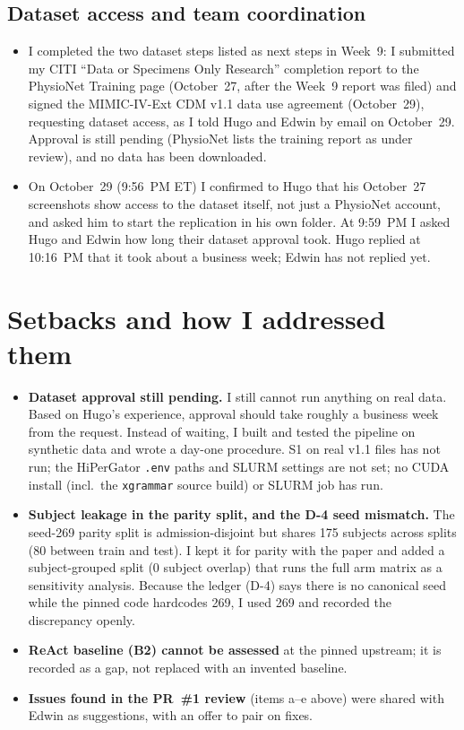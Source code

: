 \documentclass[11pt,letterpaper]{article}
\begin{document}
\subsection{Dataset access and team coordination}
\begin{itemize}
  \item I completed the two dataset steps listed as next steps in Week~9: I submitted my CITI ``Data or Specimens Only Research'' completion report to the PhysioNet Training page (October~27, after the Week~9 report was filed) and signed the MIMIC-IV-Ext CDM v1.1 data use agreement (October~29), requesting dataset access, as I told Hugo and Edwin by email on October~29. Approval is still pending (PhysioNet lists the training report as under review), and no data has been downloaded.
  \item On October~29 (9:56~PM ET) I confirmed to Hugo that his October~27 screenshots show access to the dataset itself, not just a PhysioNet account, and asked him to start the replication in his own folder. At 9:59~PM I asked Hugo and Edwin how long their dataset approval took. Hugo replied at 10:16~PM that it took about a business week; Edwin has not replied yet.
\end{itemize}

\section{Setbacks and how I addressed them}
\begin{itemize}
  \item \textbf{Dataset approval still pending.} I still cannot run anything on real data. Based on Hugo's experience, approval should take roughly a business week from the request. Instead of waiting, I built and tested the pipeline on synthetic data and wrote a day-one procedure. S1 on real v1.1 files has not run; the HiPerGator \texttt{.env} paths and SLURM settings are not set; no CUDA install (incl.\ the \texttt{xgrammar} source build) or SLURM job has run.
  \item \textbf{Subject leakage in the parity split, and the D-4 seed mismatch.} The seed-269 parity split is admission-disjoint but shares 175 subjects across splits (80 between train and test). I kept it for parity with the paper and added a subject-grouped split (0 subject overlap) that runs the full arm matrix as a sensitivity analysis. Because the ledger (D-4) says there is no canonical seed while the pinned code hardcodes 269, I used 269 and recorded the discrepancy openly.
  \item \textbf{ReAct baseline (B2) cannot be assessed} at the pinned upstream; it is recorded as a gap, not replaced with an invented baseline.
  \item \textbf{Issues found in the PR~\#1 review} (items a--e above) were shared with Edwin as suggestions, with an offer to pair on fixes.
\end{itemize}
\end{document}

